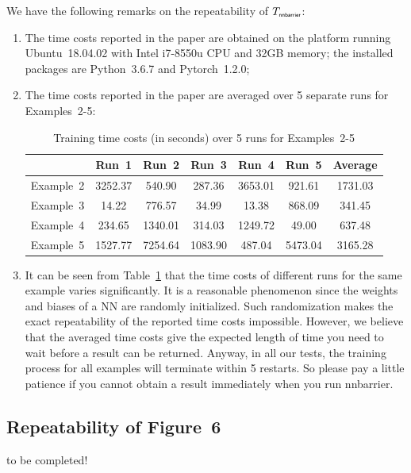 \documentclass{llncs}
\begin{document}
We have the following remarks on the repeatability of $T_{\textsf{\tiny nnbarrier}}$:
\begin{enumerate}
    \item The time costs reported in the paper are obtained on the platform running Ubuntu~18.04.02 with Intel i7-8550u
            CPU and 32GB memory; the installed packages are \textsf{\small Python~3.6.7} and \textsf{\small Pytorch~1.2.0};
    \item The time costs reported in the paper are averaged over 5 separate runs for Examples~2-5:
    \begin{table}
        \centering
        \caption{Training time costs (in \textsf{seconds}) over 5 runs for Examples~2-5}
        \label{tbl:time-cost}
        \begin{tabular}{|c|c|c|c|c|c|c|} 
            \hline                  & Run~1     & Run~2     & Run~3   & Run~4   & Run~5       & Average \\ 
            \hline Example~2        & 3252.37   & 540.90    & 287.36  & 3653.01 & 921.61      & 1731.03  \\ 
            \hline Example~3        & 14.22     & 776.57    & 34.99   & 13.38   & 868.09      & 341.45    \\ 
            \hline Example~4        & 234.65    & 1340.01   & 314.03  & 1249.72 & 49.00       & 637.48 \\
            \hline Example~5        & 1527.77   & 7254.64   & 1083.90 & 487.04  & 5473.04     & 3165.28  \\ 
            \hline
        \end{tabular}
    \end{table}
    \item It can be seen from Table~\ref{tbl:time-cost} that the time costs of different runs for the same example varies significantly. It is 
    a reasonable phenomenon since the weights and biases of a NN are randomly initialized. Such randomization makes the exact repeatability of
    the reported time costs impossible. However, we believe that the averaged time costs give the expected length of time you need to wait before
    a result can be returned. Anyway, in all our tests, the training process for all examples will terminate within 5 restarts. So please
    pay a little patience if you cannot obtain a result immediately when you run \textsf{nnbarrier}.
\end{enumerate}

\subsection{Repeatability of Figure~6}
to be completed!
\end{document}
